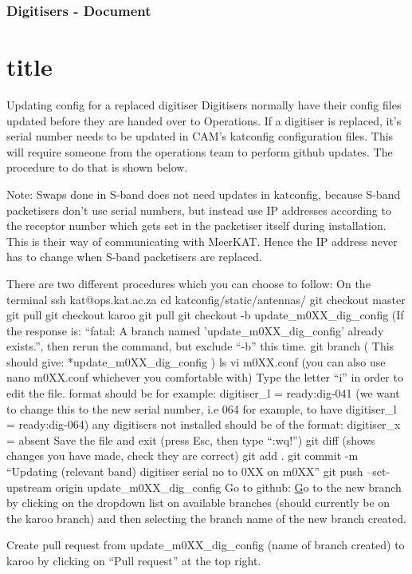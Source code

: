 


\section{Digitisers - Document}\part{title}

Updating config for a replaced digitiser
Digitisers normally have their config files updated before they are handed over to Operations. If a digitiser is replaced, it's serial number needs to be updated in CAM's katconfig configuration files. This will require someone from the operations team to perform github updates.  The procedure to do that is shown below.

Note: Swaps done in S-band does not need updates in katconfig, because S-band packetisers don’t use serial numbers, but instead use IP addresses according to the receptor number which gets set in the packetiser itself during installation. This is their way of communicating with MeerKAT. Hence the IP address never has to change when S-band packetisers are replaced. 

There are two different procedures which you can choose to follow:
On the terminal
ssh kat@ops.kat.ac.za
cd katconfig/static/antennas/
git checkout master
git pull
git checkout karoo
git pull
git checkout -b update_m0XX_dig_config (If the response is: “fatal: A branch named 'update_m0XX_dig_config' already exists.”, then rerun the command, but exclude “-b” this time.
git branch   ( This should give: *update_m0XX_dig_config )
ls
vi m0XX.conf (you can also use nano m0XX.conf whichever you comfortable with)
Type the letter “i” in order to edit the file.
format should be for example: digitiser_l = ready:dig-041 (we want to change this to the new serial number, i.e 064 for example, to have digitiser_l = ready:dig-064) 
any digitisers not installed should be of the format: digitiser_x = absent
Save the file and exit (press Esc, then type “:wq!”)
git diff (shows changes you have made, check they are correct)
git add .
git commit -m “Updating (relevant band) digitiser serial no to 0XX on m0XX”
git push --set-upstream origin update_m0XX_dig_config
Go to github: \href{https://github.com/ska-sa/katconfig}
Go to the new branch by clicking on the dropdown list on available branches (should currently be on the karoo branch) and then selecting the branch name of the new branch created.


Create pull request from update_m0XX_dig_config (name of branch created) to karoo by clicking on “Pull request” at the top right.


